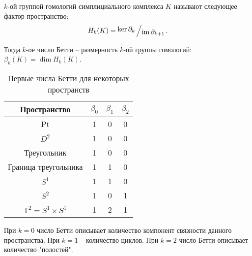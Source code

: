 \begin{definition}
	$k$-ой группой гомологий симплициального комплекса $K$ называют следующее фактор-пространство:
	\[
	H_k(K) = \quotient{\ker \partial_k}{\im \partial_{k+1}}.
	\]
	
	Тогда $k$-ое число Бетти -- размерность $k$-ой группы гомологий: $\beta_k(K) = \dim H_k(K)$. 
\end{definition}

\begin{center}
	\begin{table}[!htbp]
		\centering
		\begin{tabular}{ |c|c c c| }
			\hline
			Пространство & $\beta_0$ & $\beta_1$ & $\beta_2$ \\ 
			\hline
			Pt & 1 & 0 & 0 \\ 
			$D^2$ & 1 & 0 & 0 \\ 
			Треугольник & 1 & 0 & 0 \\
			Граница треугольника & 1 & 1 & 0 \\
			$S^1$ & 1 & 1 & 0 \\
			$S^2$ & 1 & 0 & 1 \\
			$\mathbb{T}^2 = S^1 \times S^1$ & 1 & 2 & 1 \\
			\hline
		\end{tabular}
		\caption{Первые числа Бетти для некоторых пространств}
	\end{table}
\end{center}

При $k=0$ число Бетти описывает количество компонент связности данного пространства. При $k=1$ -- количество циклов. При $k=2$ число Бетти описывает количество "полостей".
